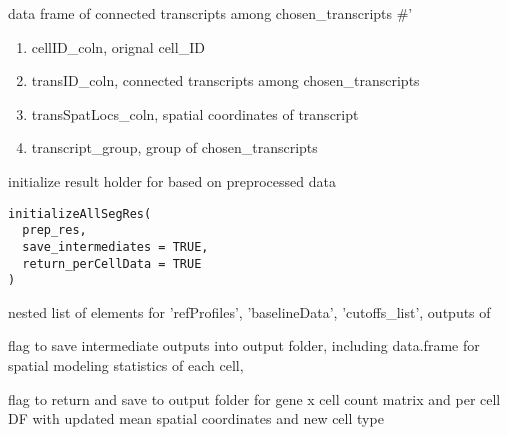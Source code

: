 \documentclass[letterpaper]{book}
\begin{document}
%
\begin{Value}
data frame of connected transcripts among chosen\_transcripts
\#' \begin{enumerate}

\item{} cellID\_coln, orignal cell\_ID
\item{} transID\_coln, connected transcripts among chosen\_transcripts
\item{} transSpatLocs\_coln, spatial coordinates of transcript
\item{} transcript\_group, group of chosen\_transcripts

\end{enumerate}

\end{Value}
%
\begin{Description}
initialize result holder for  based on preprocessed data
\end{Description}
%
\begin{Usage}
\begin{verbatim}
initializeAllSegRes(
  prep_res,
  save_intermediates = TRUE,
  return_perCellData = TRUE
)
\end{verbatim}
\end{Usage}
%
\begin{Arguments}
\begin{ldescription}
\item[\code{prep\_res}] nested list of elements for 'refProfiles', 'baselineData', 'cutoffs\_list', outputs of 

\item[\code{save\_intermediates}] flag to save intermediate outputs into output folder, including data.frame for spatial modeling statistics of each cell,

\item[\code{return\_perCellData}] flag to return and save to output folder for gene x cell count matrix and per cell DF with updated mean spatial coordinates and new cell type
\end{ldescription}
\end{Arguments}
%
\end{document}
